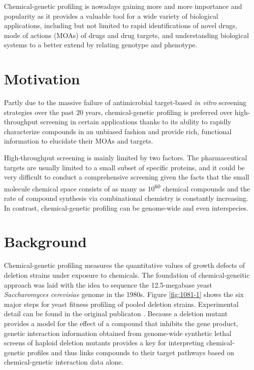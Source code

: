 \documentclass[12pt,fullpage,singlespace]{article}
\begin{document}
Chemical-genetic profiling is nowadays gaining more and more importance and popularity as it provides a valuable tool for a wide variety of biological applications, including but not limited to rapid identifications of novel drugs, mode of actions (MOAs) of drugs and drug targets, and understanding biological systems to a better extend by relating genotype and phenotype.

\section{Motivation}

Partly due to the massive failure of antimicrobial target-based \textit{in vitro} screening strategies over the past 20 years, chemical-genetic profiling is preferred over high-throughput screening in certain applications thanks to its ability to rapidly characterize compounds in an unbiased fashion and provide rich, functional information to elucidate their MOAs and targets.

High-throughput screening is mainly limited by two factors. The pharmaceutical targets are usually limited to a small subset of specific proteins, and it could be very difficult to conduct a comprehensive screening given the facts that the small molecule chemical space consists of as many as 10\textsuperscript{60} chemical compounds \citep{1104} and the rate of compound synthesis via combinational chemistry is constantly increasing. In contrast, chemical-genetic profiling can be genome-wide and even interspecies.

\section{Background}

Chemical-genetic profiling measures the quantitative values of growth defects of deletion strains under exposure to chemicals. The foundation of chemical-geneitic approach was laid with the idea to sequence the 12.5-megabase yeast \textit{Saccharomyces cerevisiae} genome in the 1980s. Figure \ref{fig:1081-1} shows the six major steps for yeast fitness profiling of pooled deletion strains. Experimental detail can be found in the original publicaton \citep{1081}. Because a deletion mutant provides a model for the effect of a compound that inhibits the gene product, genetic interaction information obtained from genome-wide synthetic lethal screens of haploid deletion mutants provides a key for interpreting chemical-genetic profiles and thus links compounds to their target pathways based on chemical-genetic interaction data alone.
\end{document}
